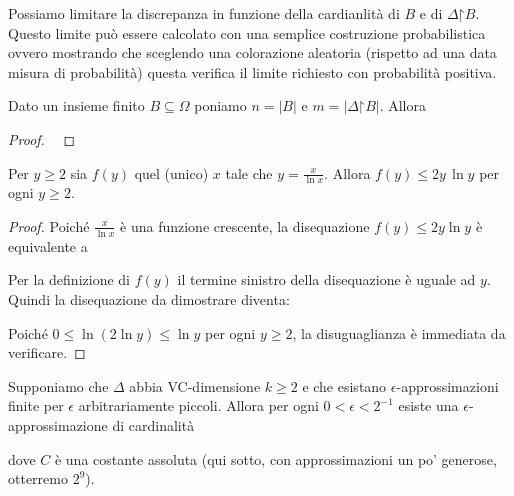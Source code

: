 Possiamo limitare la discrepanza in funzione della cardianlit\`a di $B$ e di $\Delta\mathord\restriction B$.  Questo limite pu\`o essere calcolato con una semplice costruzione probabilistica ovvero mostrando che sceglendo una colorazione aleatoria (rispetto ad una data misura di probabilit\`a) questa verifica il limite richiesto con probabilit\`a positiva.


\begin{lemma}\label{discrepanzarandom} Dato un insieme finito $B\subseteq\Omega$ poniamo $n=|B|$ e $m=|\Delta \mathord\restriction B|$. Allora 

\end{lemma}

\begin{proof}
\ 
\end{proof}

\begin{lemma}\label{lem_nemesis}
Per $y\ge2$ sia $f(y)$ quel (unico) $x$ tale che $y=\displaystyle\frac{x}{\ln x}$. Allora $f(y)\le2y\,\ln y$ per ogni $y\ge2$.
\end{lemma}

\begin{proof}
Poich\'e $\displaystyle\frac{x}{\ln x}$ \`e una funzione crescente, la disequazione $f(y)\le2y\ln y$ \`e equivalente a 


Per la definizione di $f(y)$ il termine sinistro della disequazione \`e uguale ad $y$. Quindi la disequazione da dimostrare diventa:


Poich\'e $0\le\ln(2\ln y)\le \ln y$ per ogni $y\ge2$, la disuguaglianza \`e immediata da verificare.
\end{proof}


\begin{lemma}
Supponiamo che $\Delta$ abbia VC-dimensione $k\ge 2$ e che esistano $\epsilon$-approssimazioni finite per $\epsilon$ arbitrariamente piccoli. Allora per ogni $0<\epsilon<2^{-1}$ esiste una $\epsilon$-approssimazione di cardinalit\`a 


dove $C$ \`e una costante assoluta (qui sotto, con approssimazioni un po' generose, otterremo $2^9$).
\end{lemma}

